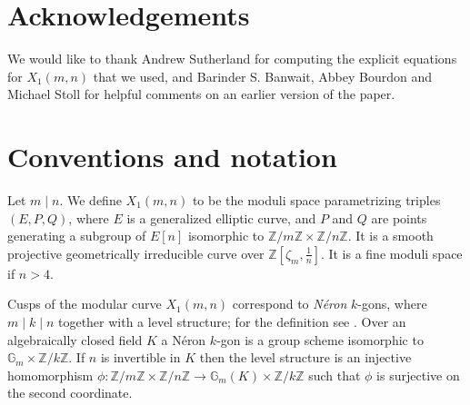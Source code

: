 \documentclass[11pt,reqno]{amsart}
\theoremstyle{definition}
\numberwithin{equation}{section}
\newcommand{\Z}{\mathbb{Z}}
\def\torz#1{\mathbb Z /#1 \mathbb Z}
\def\tg#1#2{\mathbb Z/#1\mathbb Z \times \mathbb Z /#2 \mathbb Z}
\begin{document}
 \section*{Acknowledgements}
 We would like to thank Andrew Sutherland for computing the explicit equations for $X_1(m,n)$ that we used, and Barinder S. Banwait, Abbey Bourdon and Michael Stoll for helpful comments on an earlier version of the paper. 
 

\section{Conventions and notation}


Let $m\mid n$. We define $X_1(m,n)$ to be the moduli space parametrizing triples $(E,P,Q)$, where $E$ is a generalized elliptic curve, and $P$ and $Q$ are points generating a subgroup of $E[n]$ isomorphic to $\tg{m}{n}$. It is a smooth projective geometrically irreducible curve over $\Z[\zeta_m, \frac{1}{n}]$. It is a fine moduli space if $n>4$.

Cusps of the modular curve $X_1(m,n)$ correspond to \textit{N\'eron} $k$-gons, where $m\mid  k\mid n$ together with a level structure; for the definition see \cite[Sections 1.3 and 2.2.1]{DerickxPhD}. Over an algebraically closed field $K$ a N\'eron $k$-gon is a group scheme isomorphic to $\mathbb G_m\times \torz{k}$. If $n$ is invertible in $K$ then the level structure is an injective homomorphism $\phi:\tg{m}{n}\to \mathbb G_m(K)\times \torz{k}$ such that $\phi$ is surjective on the second coordinate.
\end{document}
